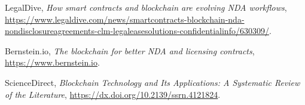 \documentclass{article}
\begin{document}
	\begin{thebibliography}{9}
		
		LegalDive,
		\textit{How smart contracts and blockchain are evolving NDA workflows},
		\url{https://www.legaldive.com/news/smartcontracts-blockchain-nda-nondisclosureagreements-clm-legaleasesolutions-confidentialinfo/630309/}.
		
		Bernstein.io,
		\textit{The blockchain for better NDA and licensing contracts},
		\url{https://www.bernstein.io}.
		
		ScienceDirect,
		\textit{Blockchain Technology and Its Applications: A Systematic Review of the Literature},
		\url{https://dx.doi.org/10.2139/ssrn.4121824}.
		
	\end{thebibliography}
	
	
\end{document}
